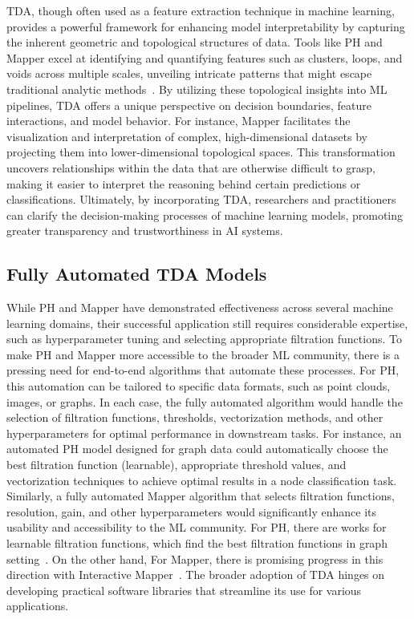 TDA, though often used as a feature extraction technique in machine learning, provides a powerful framework for enhancing model interpretability by capturing the inherent geometric and topological structures of data. Tools like PH and Mapper excel at identifying and quantifying features such as clusters, loops, and voids across multiple scales, unveiling intricate patterns that might escape traditional analytic methods~\cite{krishnapriyan2021machine,cole2021quantitative,mukherjee2022determining}. By utilizing these topological insights into ML pipelines, TDA offers a unique perspective on decision boundaries, feature interactions, and model behavior. For instance, Mapper facilitates the visualization and interpretation of complex, high-dimensional datasets by projecting them into lower-dimensional topological spaces\cite{nicolau2011topology,purvine2023experimental,rabadan2019topological,spannaus2024topological}. This transformation uncovers relationships within the data that are otherwise difficult to grasp, making it easier to interpret the reasoning behind certain predictions or classifications. Ultimately, by incorporating TDA, researchers and practitioners can clarify the decision-making processes of machine learning models, promoting greater transparency and trustworthiness in AI systems.

\subsection{Fully Automated TDA Models}

While PH and Mapper have demonstrated effectiveness across several machine learning domains, their successful application still requires considerable expertise, such as hyperparameter tuning and selecting appropriate filtration functions. To make PH and Mapper more accessible to the broader ML community, there is a pressing need for end-to-end algorithms that automate these processes. For PH, this automation can be tailored to specific data formats, such as point clouds, images, or graphs. In each case, the fully automated algorithm would handle the selection of filtration functions, thresholds, vectorization methods, and other hyperparameters for optimal performance in downstream tasks. For instance, an automated PH model designed for graph data could automatically choose the best filtration function (learnable), appropriate threshold values, and vectorization techniques to achieve optimal results in a node classification task. Similarly, a fully automated Mapper algorithm that selects filtration functions, resolution, gain, and other hyperparameters would significantly enhance its usability and accessibility to the ML community. For PH, there are works for learnable filtration functions, which find the best filtration functions in graph setting~\cite{hofer2020graph,zhang2022gefl}. On the other hand, For Mapper, there is promising progress in this direction with Interactive Mapper~\cite{zhou2021mapper}. The broader adoption of TDA hinges on developing practical software libraries that streamline its use for various applications.

